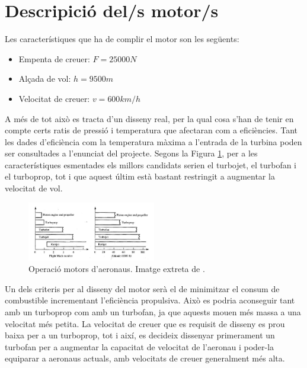 \section{Descripició del/s motor/s}
\label{descripcio}
Les característiques que ha de complir el motor son les següents:
\begin{itemize}
\item Empenta de creuer: $F=25000N$
\item Alçada de vol: $h=9500m$
\item Velocitat de creuer: $v=600km/h$
\end{itemize}
A més de tot això es tracta d'un disseny real, per la qual cosa s'han de tenir en compte certs ratis de pressió i temperatura que afectaran com a eficiències. Tant les dades d'eficiència com la temperatura màxima a l'entrada de la turbina poden ser consultades a l'enunciat del projecte.
Segons la Figura \ref{operacio}, per a les característiques esmentades els millors candidats serien el turbojet, el turbofan i el turboprop, tot i que aquest últim està bastant restringit a augmentar la velocitat de vol.
\begin{figure}[H]
\centering
\includegraphics[width=0.5\textwidth]{./pics/seleccio.JPG} 
\caption{Operació motors d'aeronaus. Imatge extreta de \cite{mattingly}.}
\label{operacio}
\end{figure}
\noindent Un dels criteris per al disseny del motor serà el de minimitzar el consum de combustible incrementant l'eficiència propulsiva. Això es podria aconseguir tant amb un turboprop com amb un turbofan, ja que aquests mouen més massa a una velocitat més petita. La velocitat de creuer que es requisit de disseny es prou baixa per a un turboprop, tot i així, es decideix dissenyar primerament un turbofan per a augmentar la capacitat de velocitat de l'aeronau i poder-la equiparar a aeronaus actuals, amb velocitats de creuer generalment més alta. 